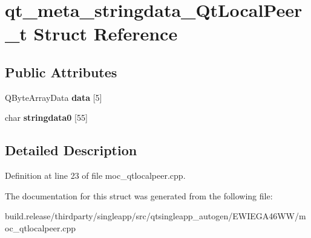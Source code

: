 \hypertarget{structqt__meta__stringdata___qt_local_peer__t}{}\section{qt\+\_\+meta\+\_\+stringdata\+\_\+\+Qt\+Local\+Peer\+\_\+t Struct Reference}
\label{structqt__meta__stringdata___qt_local_peer__t}
\subsection*{Public Attributes}
\begin{DoxyCompactItemize}
\item 
\mbox{\label{structqt__meta__stringdata___qt_local_peer__t_ad7c40ac410f30d613a2dc85e4772d76f}} 
Q\+Byte\+Array\+Data {\bfseries data} \mbox{[}5\mbox{]}
\item 
\mbox{\label{structqt__meta__stringdata___qt_local_peer__t_a48b509fc0edf10a53831a8779c3af71a}} 
char {\bfseries stringdata0} \mbox{[}55\mbox{]}
\end{DoxyCompactItemize}


\subsection{Detailed Description}


Definition at line 23 of file moc\+\_\+qtlocalpeer.\+cpp.



The documentation for this struct was generated from the following file\+:\begin{DoxyCompactItemize}
\item 
build.\+release/thirdparty/singleapp/src/qtsingleapp\+\_\+autogen/\+E\+W\+I\+E\+G\+A46\+W\+W/moc\+\_\+qtlocalpeer.\+cpp\end{DoxyCompactItemize}
